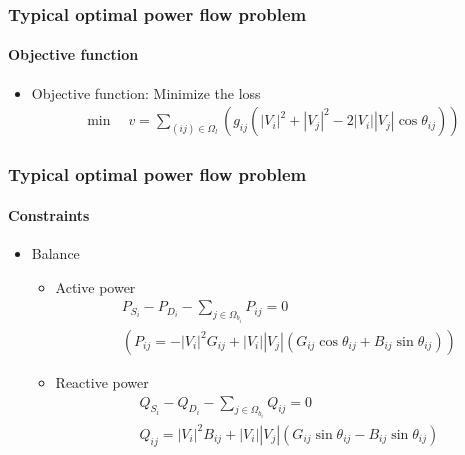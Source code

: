 \documentclass[
	11pt, %
	aspectratio=169, %
]{beamer}
\begin{document}

\begin{frame}
	\frametitle{Typical optimal power flow problem}
	\framesubtitle{Objective function} %
	\begin{itemize}
		\item Objective function: Minimize the loss
		\begin{align*}
			\min \quad v= \sum_{(ij) \in \Omega_{l} }
			(g_{ij}(\left|V_{i}\right|^{2}+\left|V_{j}\right|^{2}-2\left|V_{i}\right| \left|V_{j}\right|\cos\theta_{ij}))
		\end{align*}
	\end{itemize}
\end{frame}




\begin{frame}
	\frametitle{Typical optimal power flow problem}
	\framesubtitle{Constraints} %
	
	\begin{itemize}
	\item Balance
		\begin{itemize}
			\item Active power
				\begin{align*}
					&P_{S_{i}}-P_{D_{i}}-\sum_{j \in \Omega_{b_{i}}} P_{ij} = 0\\
					&(P_{ij}=-\left|V_{i} \right|^{2}G_{ij}+\left|V_{i} \right|\left|V_{j} \right|(G_{ij}\cos\theta_{ij} + B_{ij}\sin\theta_{ij}))
				\end{align*}

			\item Reactive power
				\begin{align*}
					&Q_{S_{i}}-Q_{D_{i}}-\sum_{j \in \Omega_{b_{i}}} Q_{ij} = 0\\
					&Q_{ij}=\left|V_{i} \right|^{2}B_{ij}+\left|V_{i} \right|\left|V_{j} \right|(G_{ij}\sin\theta_{ij} - B_{ij}\sin\theta_{ij})
				\end{align*}
		\end{itemize}

	\end{itemize}
	
	
\end{frame}


\end{document}
